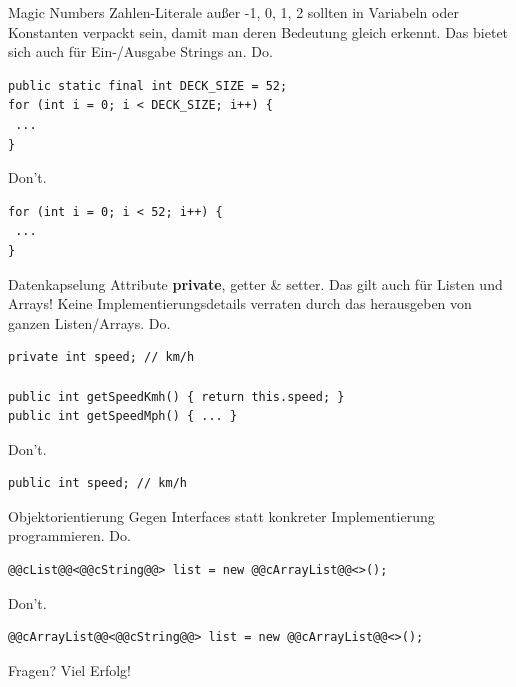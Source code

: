 \documentclass[aspectratio=169]{beamer}
\newcommand{\HUMONGOUS}{\Huge}
\begin{document}
\begin{frame}[fragile]
  \begin{block}{Magic Numbers}
    Zahlen-Literale außer -1, 0, 1, 2 sollten in Variabeln oder Konstanten verpackt sein, damit man deren Bedeutung gleich erkennt.
    Das bietet sich auch für Ein-/Ausgabe Strings an. \linebreak
    \pause
    \color{nicegreen}Do.\color{FGround}
    \begin{lstlisting}[numbers=none]
public static final int DECK_SIZE = 52; 
for (int i = 0; i < DECK_SIZE; i++) { 
 ...
}
    \end{lstlisting}
    \pause
    \color{alertcolor}Don't.\color{FGround}
    \begin{lstlisting}[numbers=none]
for (int i = 0; i < 52; i++) { 
 ...
} 
    \end{lstlisting}
  \end{block}
\end{frame}

\begin{frame}[fragile]
  \begin{block}{Datenkapselung}
    Attribute \textbf{private}, getter \& setter. Das gilt auch für Listen und Arrays! 
    Keine Implementierungsdetails verraten durch das herausgeben von ganzen Listen/Arrays. \linebreak
    \pause
    \color{nicegreen}Do.\color{FGround}
    \begin{lstlisting}[numbers=none]
private int speed; // km/h

public int getSpeedKmh() { return this.speed; }
public int getSpeedMph() { ... }
    \end{lstlisting}
    \pause
    \color{alertcolor}Don't.\color{FGround}
    \begin{lstlisting}[numbers=none]
public int speed; // km/h
    \end{lstlisting}
  \end{block}
\end{frame}

\begin{frame}[fragile]
  \begin{block}{Objektorientierung}
    Gegen Interfaces statt konkreter Implementierung programmieren. \linebreak
    \pause
    \color{nicegreen}Do.\color{FGround}
    \begin{lstlisting}[numbers=none]
@@cList@@<@@cString@@> list = new @@cArrayList@@<>();
    \end{lstlisting}
    \pause
    \color{alertcolor}Don't.\color{FGround}
    \begin{lstlisting}[numbers=none]
@@cArrayList@@<@@cString@@> list = new @@cArrayList@@<>();
    \end{lstlisting}
  \end{block}
\end{frame}



\begin{frame}
  \begin{center}\HUMONGOUS Fragen?
    \pause
    \linebreak
    \linebreak
    Viel Erfolg!
  \end{center}
\end{frame}
\end{document}
